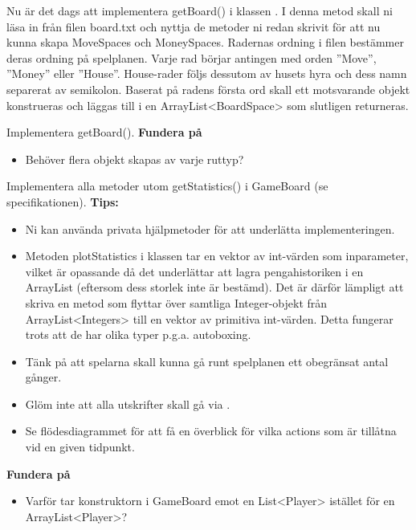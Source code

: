 \Task Nu är det dags att implementera getBoard() i klassen . I denna metod skall ni läsa in från filen board.txt och nyttja de metoder ni redan skrivit för att nu kunna skapa MoveSpaces och MoneySpaces. Radernas ordning i filen bestämmer deras ordning på spelplanen. Varje rad börjar antingen med orden ''Move'', ''Money'' eller ''House''. House-rader följs dessutom av husets hyra och dess namn separerat av semikolon. Baserat på radens första ord skall ett motsvarande objekt konstrueras och läggas till i en ArrayList<BoardSpace> som slutligen returneras.



\Subtask Implementera getBoard().
\newline
\newline
\textbf{Fundera på}
\begin{itemize}
\item Behöver flera objekt skapas av varje ruttyp?
\end{itemize}

\Task Implementera alla metoder utom getStatistics() i GameBoard (se specifikationen).
\newline
\newline
\textbf{Tips:}

\begin{itemize}
\item Ni kan använda privata hjälpmetoder för att underlätta implementeringen.
\item Metoden plotStatistics i klassen  tar en vektor av int-värden som inparameter, vilket är opassande då det underlättar att lagra pengahistoriken i en ArrayList (eftersom dess storlek inte är bestämd). Det är därför lämpligt att skriva en metod som flyttar över samtliga Integer-objekt från ArrayList<Integers> till en vektor av primitiva int-värden. Detta fungerar trots att de har olika typer p.g.a. autoboxing. 
\item Tänk på att spelarna skall kunna gå runt spelplanen ett obegränsat antal gånger.
\item Glöm inte att alla utskrifter skall gå via  .
\item Se flödesdiagrammet för att få en överblick för vilka actions som är tillåtna vid en given tidpunkt.
\end{itemize}

\textbf{Fundera på}
\begin{itemize}
\item Varför tar konstruktorn i GameBoard emot en List<Player> istället för en ArrayList<Player>?
\end{itemize}

